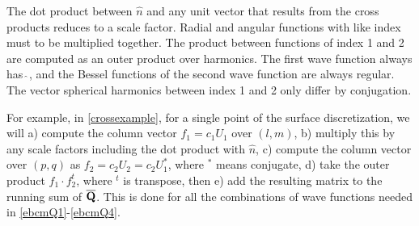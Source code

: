 \begin{itemize}
The dot product between $\hat{n}$ and any unit vector that results from the cross products reduces to a scale factor. Radial and angular functions with like index must to be multiplied together. The product between functions of index 1 and 2 are computed as an outer product over harmonics. The first wave function always has $\hat{\ }$, and the Bessel functions of the second wave function are always regular. The vector spherical harmonics between index 1 and 2 only differ by conjugation. 

For example, in \eqref{crossexample}, for a single point of the surface discretization, we will a) compute the column vector $f_1 = c_1U_1$ over $(l,m)$, b) multiply this by any scale factors including the dot product with $\hat{n}$, c) compute the column vector over $(p,q)$ as $f_2 = c_2 U_2 = c_2 U_1^*$, where $^*$ means conjugate, d) take the outer product $f_1 \cdot f_2^t$, where $^t$ is transpose, then e) add the resulting matrix to the running sum of $\overline{\mathbf{Q}}$. This is done for all the combinations of wave functions needed in \eqref{ebcmQ1}-\eqref{ebcmQ4}. 
\end{itemize}

\vspace{-5mm}

